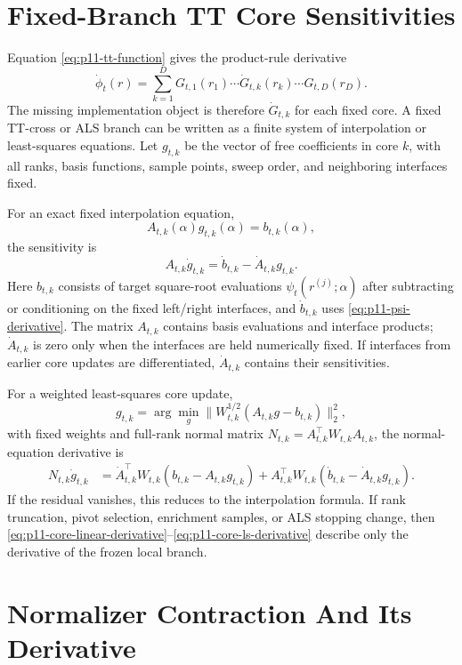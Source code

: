 \documentclass[11pt]{article}
\begin{document}
\section{Fixed-Branch TT Core Sensitivities}

Equation \eqref{eq:p11-tt-function} gives the product-rule derivative
\[
  \dot\phi_t(r)
  =
  \sum_{k=1}^D
  G_{t,1}(r_1)\cdots
  \dot G_{t,k}(r_k)\cdots
  G_{t,D}(r_D).
  \label{eq:p11-tt-product-rule}
\]
The missing implementation object is therefore \(\dot G_{t,k}\) for each
fixed core.  A fixed TT-cross or ALS branch can be written as a finite system
of interpolation or least-squares equations.  Let \(g_{t,k}\) be the vector of
free coefficients in core \(k\), with all ranks, basis functions, sample
points, sweep order, and neighboring interfaces fixed.

For an exact fixed interpolation equation,
\[
  A_{t,k}(\alpha)g_{t,k}(\alpha)=b_{t,k}(\alpha),
  \label{eq:p11-core-linear}
\]
the sensitivity is
\[
  A_{t,k}\dot g_{t,k}
  =
  \dot b_{t,k}-\dot A_{t,k}g_{t,k}.
  \label{eq:p11-core-linear-derivative}
\]
Here \(b_{t,k}\) consists of target square-root evaluations
\(\psi_t(r^{(j)};\alpha)\) after subtracting or conditioning on the fixed
left/right interfaces, and \(\dot b_{t,k}\) uses
\eqref{eq:p11-psi-derivative}.  The matrix \(A_{t,k}\) contains basis
evaluations and interface products; \(\dot A_{t,k}\) is zero only when the
interfaces are held numerically fixed.  If interfaces from earlier core
updates are differentiated, \(\dot A_{t,k}\) contains their sensitivities.

For a weighted least-squares core update,
\[
  g_{t,k}
  =
  \arg\min_g \|W_{t,k}^{1/2}(A_{t,k}g-b_{t,k})\|_2^2,
  \label{eq:p11-core-ls}
\]
with fixed weights and full-rank normal matrix
\(N_{t,k}=A_{t,k}^\top W_{t,k}A_{t,k}\), the normal-equation derivative is
\[
\begin{aligned}
  N_{t,k}\dot g_{t,k}
  &=
  \dot A_{t,k}^\top W_{t,k}(b_{t,k}-A_{t,k}g_{t,k})
  +A_{t,k}^\top W_{t,k}(\dot b_{t,k}-\dot A_{t,k}g_{t,k}).
  \label{eq:p11-core-ls-derivative}
\end{aligned}
\]
If the residual vanishes, this reduces to the interpolation formula.  If rank
truncation, pivot selection, enrichment samples, or ALS stopping change, then
\eqref{eq:p11-core-linear-derivative}--\eqref{eq:p11-core-ls-derivative}
describe only the derivative of the frozen local branch.

\section{Normalizer Contraction And Its Derivative}
\end{document}
